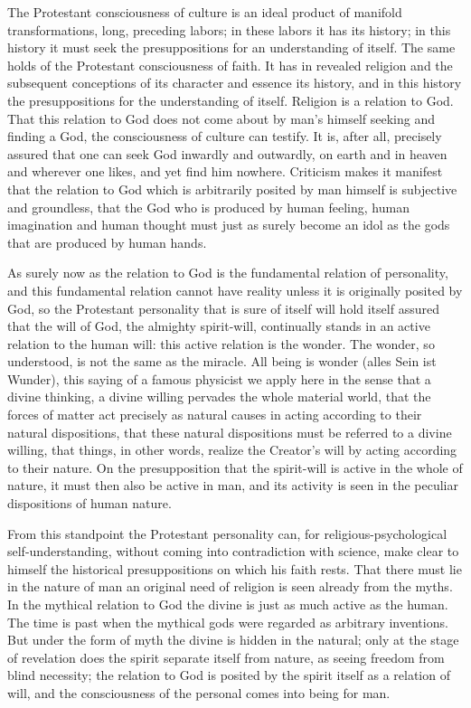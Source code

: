 \documentclass[12pt,a4paper,openany]{book}
\newcommand{\opage}[1]{\marginnote{\footnotesize\textit{[#1]}}}
\begin{document}
The Protestant consciousness of culture is an ideal
product of manifold transformations, long, preceding
labors; in these labors it has its history;
in this history it must seek the presuppositions for
an understanding of itself. The same holds of the
Protestant consciousness of faith. It has in revealed
religion and the subsequent conceptions of its
character and essence its history, and in this history
the presuppositions for the understanding of itself. Religion
is a relation to God. That this relation to God does not
come about by man's himself seeking and
finding a God, the consciousness of culture can testify.
It is, after all, precisely assured that one can seek God
inwardly and outwardly, on earth and in heaven and wherever
one likes, and yet find him nowhere. Criticism makes it
manifest that the relation to God which is arbitrarily posited by
man himself is subjective and groundless, that the God
who is produced by human feeling, human imagination
and human thought must just as surely become an idol
as the gods that are produced by human hands.

As surely now as the relation to God is the fundamental relation
of personality, and this fundamental relation cannot have
reality unless it is originally posited by God, so
the Protestant personality that is sure of itself
will hold itself assured that the will of God, the almighty
spirit-will, continually stands in an active relation
\setcounter{footnote}{0}%
\opage{70}to the human will: this active relation is the wonder.
The wonder, so understood, is not the same as
the miracle. All being is wonder (alles Sein ist Wunder),
this saying of a famous physicist we apply here in the
sense that a divine thinking, a divine
willing pervades the whole material world, that
the forces of matter act precisely as natural causes
in acting according to their natural dispositions, that these natural
dispositions must be referred to a divine
willing, that things, in other words, realize the Creator's
will by acting according to their nature. On the
presupposition that the spirit-will is active in the whole of
nature, it must then also be active in man,
and its activity is seen in the peculiar dispositions of human nature.

From this standpoint the Protestant personality
can, for religious-psychological self-understanding, without
coming into contradiction with science, make clear to himself the
historical presuppositions on which his faith rests.
That there must lie in the nature of man an original
need of religion is seen already from the myths. In the
mythical relation to God the divine is just as
much active as the human. The time is past
when the mythical gods were regarded as arbitrary inventions.
But under the form of myth the divine is
hidden in the natural; only at the stage of revelation
does the spirit separate itself from nature, as
seeing freedom from blind necessity; the relation to God
is posited by the spirit itself as a relation of will,
and the consciousness of the personal comes into being for
man.
\end{document}
